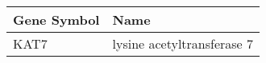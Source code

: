 \begin{tabular}{ll}
\toprule
Gene Symbol &                       Name \\
\midrule
       KAT7 & lysine acetyltransferase 7 \\
\bottomrule
\end{tabular}
